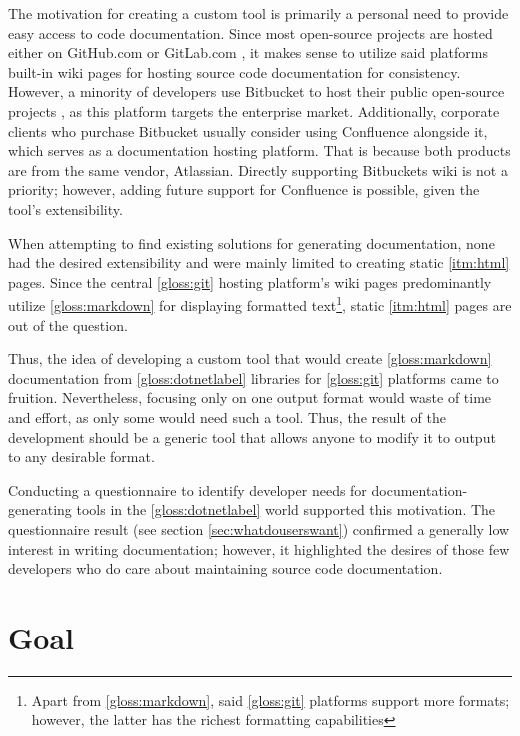The motivation for creating a custom tool is primarily a personal need to provide easy access to code documentation. Since most open-source projects are hosted either on GitHub.com or GitLab.com \cite{alphabet_inc_google_2022}, it makes sense to utilize said platforms built-in wiki pages for hosting source code documentation for consistency. However, a minority of developers use Bitbucket to host their public open-source projects \cite{jiricek_why_2022}, as this platform targets the enterprise market. Additionally, corporate clients who purchase Bitbucket usually consider using Confluence alongside it, which serves as a documentation hosting platform. That is because both products are from the same vendor, Atlassian. Directly supporting Bitbuckets wiki is not a priority; however, adding future support for Confluence is possible, given the tool's extensibility.

When attempting to find existing solutions for generating documentation, none had the desired extensibility and were mainly limited to creating static \ref{itm:html} pages.
Since the central \ref{gloss:git} hosting platform's wiki pages predominantly utilize \ref{gloss:markdown} for displaying formatted text\footnote{Apart from \ref{gloss:markdown}, said \ref{gloss:git} platforms support more formats; however, the latter has the richest formatting capabilities}, static \ref{itm:html} pages are out of the question.

Thus, the idea of developing a custom tool that would create \ref{gloss:markdown} documentation from \ref{gloss:dotnetlabel} libraries for \ref{gloss:git} platforms came to fruition. Nevertheless, focusing only on one output format would waste of time and effort, as only some would need such a tool. Thus, the result of the development should be a generic tool that allows anyone to modify it to output to any desirable format.

Conducting a questionnaire to identify developer needs for documentation-generating tools in the \ref{gloss:dotnetlabel} world supported this motivation. The questionnaire result (see section \ref{sec:whatdouserswant}) confirmed a generally low interest in writing documentation; however, it highlighted the desires of those few developers who do care about maintaining source code documentation.

\section*{Goal}

